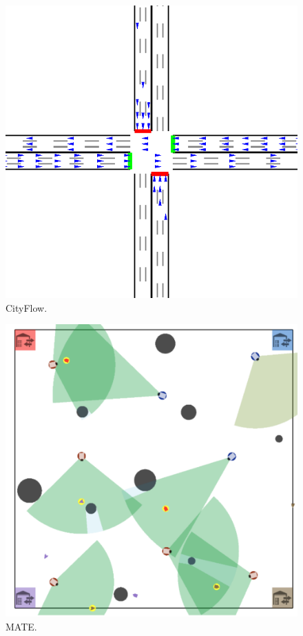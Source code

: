 \begin{subfigure}[b]{0.33\textwidth}
        \centering
        \includegraphics[width=.95\textwidth]{figures/ch3/cityflow.png}
        \caption{CityFlow.}
\end{subfigure}%
\begin{subfigure}[b]{0.33\textwidth}
        \centering
        \includegraphics[width=.95\textwidth]{figures/ch3/MATE.png}
        \caption{MATE.}
\end{subfigure}
